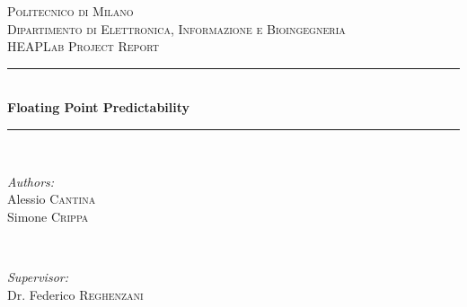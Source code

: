 \begin{titlepage}

\newcommand{\HRule}{\rule{\linewidth}{0.5mm}} %

\center %
 

\textsc{\LARGE Politecnico di Milano}\\[1.5cm] %
\textsc{\Large Dipartimento di Elettronica, Informazione e Bioingegneria}\\[0.5cm] %
\textsc{\large HEAPLab Project Report}\\[0.5cm] %


\HRule \\[0.4cm]
{ \huge \bfseries Floating Point Predictability}\\[0.4cm] %
\HRule \\[1.5cm]
 

\begin{minipage}{0.4\textwidth}
\begin{flushleft} \large
\emph{Authors:}\\
Alessio \textsc{Cantina}\\ %
Simone \textsc{Crippa}
\end{flushleft}
\end{minipage}
~
\begin{minipage}{0.5\textwidth}
\begin{flushright} \large
\emph{Supervisor:} \\
Dr. Federico \textsc{Reghenzani} %
\end{flushright}
\end{minipage}\\[1cm]


\end{titlepage}
